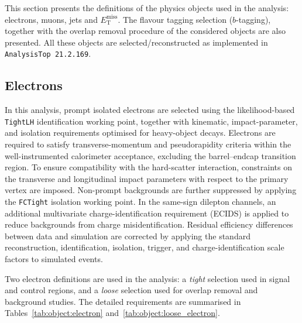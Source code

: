 ﻿This section presents the definitions of the physics objects used in the analysis: electrons, muons, jets and \ensuremath{E_{\mathrm{T}}^{\mathrm{miss}}}.  
The flavour tagging selection ($b$-tagging), together with the overlap removal procedure of the considered objects are also presented. 
All these objects are selected/reconstructed as implemented  in \texttt{AnalysisTop 21.2.169}.

\subsection{Electrons}
\label{subsec:obj-electrons}

In this analysis, prompt isolated electrons
are selected using the likelihood-based \texttt{TightLH}
identification working point, together with kinematic, impact-parameter,
and isolation requirements optimised for heavy-object decays.
Electrons are required to satisfy transverse-momentum and pseudorapidity
criteria within the well-instrumented calorimeter acceptance,
excluding the barrel–endcap transition region.
To ensure compatibility with the hard-scatter interaction,
constraints on the transverse and longitudinal impact parameters
with respect to the primary vertex are imposed.
Non-prompt backgrounds are further suppressed by applying the
\texttt{FCTight} isolation working point.
In the same-sign dilepton channels, an additional multivariate
charge-identification requirement (ECIDS) is applied to reduce
backgrounds from charge misidentification.
Residual efficiency differences between data and simulation
are corrected by applying the standard reconstruction,
identification, isolation, trigger, and charge-identification
scale factors to simulated events.

Two electron definitions are used in the analysis:
a \textit{tight} selection used in signal and control regions,
and a \textit{loose} selection used for overlap removal and
background studies. The detailed requirements are summarised
in Tables~\ref{tab:object:electron} and~\ref{tab:object:loose_electron}.

